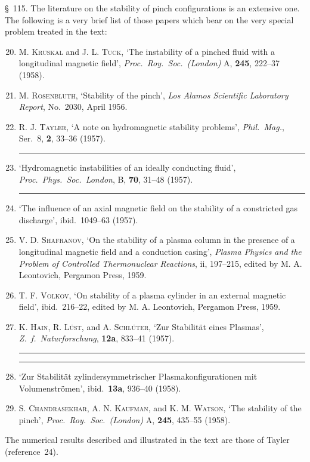 \S~115. The literature on the stability of pinch configurations is an extensive one. The following is a very brief list of those papers which bear on the very special problem treated in the text:
\begin{enumerate}
\setcounter{enumi}{19}
\item M. \textsc{Kruskal} and J. L. \textsc{Tuck}, `The instability of a pinched fluid with a longitudinal magnetic field', \emph{Proc.\ Roy.\ Soc.\ (London)} A, \textbf{245}, 222--37 (1958).

\item M. \textsc{Rosenbluth}, `Stability of the pinch', \emph{Los Alamos Scientific Laboratory Report}, No.~2030, April 1956.

\item R. J. \textsc{Tayler}, `A note on hydromagnetic stability problems', \emph{Phil.\ Mag.}, Ser.~8, \textbf{2}, 33--36 (1957).

\item \rule{1cm}{0.4pt} `Hydromagnetic instabilities of an ideally conducting fluid', \emph{Proc.\ Phys.\ Soc.\ London}, B, \textbf{70}, 31--48 (1957).

\item \rule{1cm}{0.4pt} `The influence of an axial magnetic field on the stability of a constricted gas discharge', ibid.\ 1049--63 (1957).

\item V. D. \textsc{Shafranov}, `On the stability of a plasma column in the presence of a longitudinal magnetic field and a conduction casing', \emph{Plasma Physics and the Problem of Controlled Thermonuclear Reactions}, ii, 197--215, edited by M. A. Leontovich, Pergamon Press, 1959.

\item T. F. \textsc{Volkov}, `On stability of a plasma cylinder in an external magnetic field', ibid.\ 216--22, edited by M. A. Leontovich, Pergamon Press, 1959.

\item K. \textsc{Hain}, R. \textsc{L\"ust}, and A. \textsc{Schl\"uter}, `Zur Stabilit\"at eines Plasmas', \emph{Z.\ f.\ Naturforschung}, \textbf{12a}, 833--41 (1957).

\item \rule{1cm}{0.4pt} \rule{1cm}{0.4pt} `Zur Stabilit\"at zylindersymmetrischer Plasmakonfigurationen mit Volumenstr\"omen', ibid.\ \textbf{13a}, 936--40 (1958).

\item S. \textsc{Chandrasekhar}, A. N. \textsc{Kaufman}, and K. M. \textsc{Watson}, `The stability of the pinch', \emph{Proc.\ Roy.\ Soc.\ (London)} A, \textbf{245}, 435--55 (1958).
\end{enumerate}

The numerical results described and illustrated in the text are those of Tayler (reference~24).
